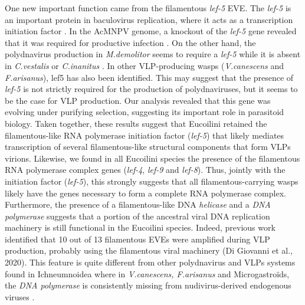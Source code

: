 One new important function came from the filamentous \textit{lef-5} EVE. The \textit{lef-5} is an important protein in baculovirus replication, where it acts as a transcription initiation factor \citep{su_autographa_2011}. In the AcMNPV genome, a knockout of the \textit{lef-5} gene revealed that it was required for productive infection \citep{su_autographa_2011}. On the other hand, the polydnavirus  production in \textit{M.demolitor} seems to require a \textit{lef-5} while it is absent in \textit{C.vestalis} or \textit{C.inanitus} \citep{burke_common_2019}. In other VLP-producing wasps (\textit{V.canescens} and \textit{F.arisanus}), lef5 has also been identified. This may suggest that the presence of \textit{lef-5} is not strictly required for the production of polydnaviruses, but it seems to be the case for VLP production. Our analysis revealed that this gene was evolving under purifying selection, suggesting its important role in parasitoid biology. Taken together, these results suggest that Eucoilini retained the filamentous-like RNA polymerase initiation factor (\textit{lef-5}) that likely mediates transcription of several filamentous-like structural components that form VLPs virions. Likewise, we found in all Eucoilini species the presence of the filamentous RNA polymerase complex genes (\textit{lef-4}, \textit{lef-9} and \textit{lef-8}). Thus, jointly with the initiation factor (\textit{lef-5}), this strongly suggests that all filamentous-carrying wasps likely have the genes necessary to form a complete RNA polymerase complex. Furthermore, the presence of a filamentous-like DNA \textit{helicase} and a \textit{DNA polymerase} suggests that a portion of the ancestral viral DNA replication machinery is still functional in the Eucoilini species. Indeed, previous work identified that 10 out of 13 filamentous EVEs were amplified during VLP production, probably using the filamentous viral machinery (Di Giovanni et al., 2020). This feature is quite different from other polydnavirus and VLPs systems found in Ichneumnoidea where in \textit{V.canescens, F.arisanus} and Microgastroïds, the \textit{DNA polymerase} is consistently missing from nudivirus-derived endogenous viruses \citep{burke_common_2019,petersen_naked_2022}.

